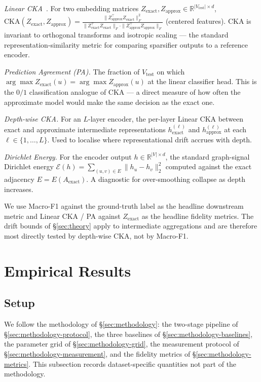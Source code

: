 \documentclass[sigconf]{acmart}
\begin{document}
\emph{Linear CKA}~\cite{kornblith2019cka}.
For two embedding matrices $Z_\text{exact}, Z_\text{approx}\in\mathbb{R}^{|V_\text{test}|\times d}$,
$\mathrm{CKA}(Z_\text{exact}, Z_\text{approx}) = \frac{\|Z_\text{approx}^\top Z_\text{exact}\|_F^2}{\|Z_\text{exact}^\top Z_\text{exact}\|_F \cdot \|Z_\text{approx}^\top Z_\text{approx}\|_F}$
(centered features). CKA is invariant to orthogonal transforms and isotropic scaling --- the standard representation-similarity metric for comparing sparsifier outputs to a reference encoder.

\emph{Prediction Agreement (PA).} The fraction of $V_\text{test}$ on which $\arg\max Z_\text{exact}(u) = \arg\max Z_\text{approx}(u)$ at the linear classifier head. This is the $0/1$ classification analogue of CKA --- a direct measure of how often the approximate model would make the same decision as the exact one.

\emph{Depth-wise CKA.} For an $L$-layer encoder, the per-layer Linear CKA between exact and approximate intermediate representations $h^{(\ell)}_\text{exact}$ and $h^{(\ell)}_\text{approx}$ at each $\ell\in\{1,\ldots,L\}$. Used to localise where representational drift accrues with depth.

\emph{Dirichlet Energy.} For the encoder output $h\in\mathbb{R}^{|V|\times d}$, the standard graph-signal Dirichlet energy
$\mathcal{E}(h) = \sum_{(u,v)\in E} \|h_u-h_v\|_2^2$
computed against the exact adjacency $E = E(A_\text{exact})$. A diagnostic for over-smoothing collapse as depth increases.

We use Macro-F1 against the ground-truth label as the headline downstream metric and Linear CKA / PA against $Z_\text{exact}$ as the headline fidelity metrics. The drift bounds of \S\ref{sec:theory} apply to intermediate aggregations and are therefore most directly tested by depth-wise CKA, not by Macro-F1.

\fussy

\section{Empirical Results}
\label{sec:experiments}

\subsection{Setup}

We follow the methodology of \S\ref{sec:methodology}: the two-stage pipeline of \S\ref{sec:methodology-protocol}, the three baselines of \S\ref{sec:methodology-baselines}, the parameter grid of \S\ref{sec:methodology-grid}, the measurement protocol of \S\ref{sec:methodology-measurement}, and the fidelity metrics of \S\ref{sec:methodology-metrics}. This subsection records dataset-specific quantities not part of the methodology.
\end{document}
